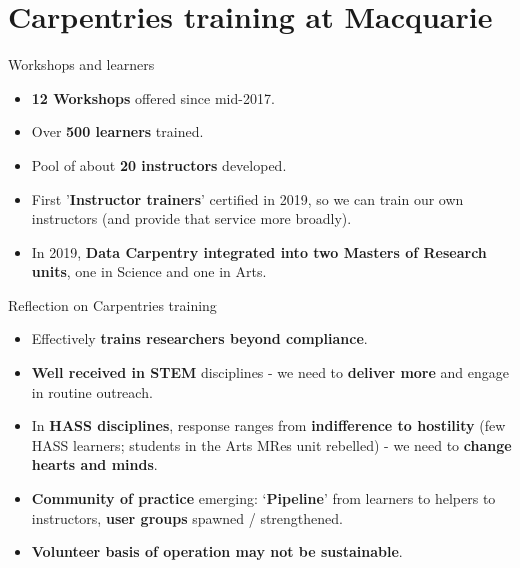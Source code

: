 \documentclass[aspectratio=169, 11pt]{beamer} %
\begin{document}
\section{Carpentries training at Macquarie}

\begin{frame}{Workshops and learners}
  \begin{itemize}[label=\textbullet]
    \item \textbf{12 Workshops} offered since mid-2017.
    \item Over \textbf{500 learners} trained.
    \item Pool of about \textbf{20 instructors} developed.
    \item First '\textbf{Instructor trainers}' certified in 2019, so we can train our own instructors (and provide that service more broadly).
    \item In 2019, \textbf{Data Carpentry integrated into two Masters of Research units}, one in Science and one in Arts.
  \end{itemize}
\end{frame}

\begin{frame}{Reflection on Carpentries training}
  \begin{itemize}[label=\textbullet]
    \item Effectively \textbf{trains researchers beyond compliance}.
    \item \textbf{Well received in STEM} disciplines - we need to \textbf{deliver more} and engage in routine outreach.
    \item In \textbf{HASS disciplines}, response ranges from \textbf{indifference to hostility} (few HASS learners; students in the Arts MRes unit rebelled) - we need to \textbf{change hearts and minds}.
    \item \textbf{Community of practice} emerging: `\textbf{Pipeline}' from learners to helpers to instructors, \textbf{user groups} spawned / strengthened.
    \item \textbf{Volunteer basis of operation may not be sustainable}.
  \end{itemize}
\end{frame}
\end{document}
